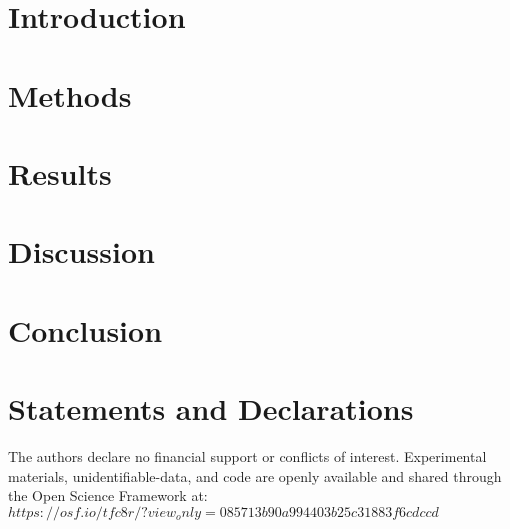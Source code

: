 \documentclass[sn-apa]{sn-jnl}%
\theoremstyle{thmstyleone}%
\theoremstyle{thmstyletwo}%
\theoremstyle{thmstylethree}%
\begin{document}





\maketitle
\section{Introduction}\label{sec1}


\section{Methods}\label{sec2}


\section{Results}\label{sec3}


\section{Discussion}\label{sec4}


\section{Conclusion}\label{sec5}


\section*{Statements and Declarations}

The authors declare no financial support or conflicts of interest. Experimental materials, unidentifiable-data, and code are openly available and shared through the Open Science Framework at: $https://osf.io/tfc8r/?view_only=085713b90a994403b25c31883f6cdccd $

\noindent



\end{document}
